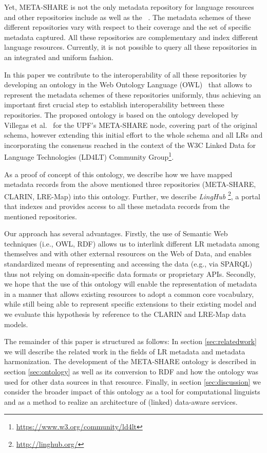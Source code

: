 \documentclass{llncs}
\begin{document}
Yet, META-SHARE is not the only metadata repository for language resources and other repositories include \cite[CLARIN]{broeder2010data} as well as the 
~\cite[LRE-Map]{calzolari2012lre}. The metadata schemes of these different repositories vary with respect to their coverage and the set of specific metadata captured. 
All these repositories are complementary and index different language resources. Currently, it is not possible to query all these repositories in an integrated and uniform fashion. 

In this paper we contribute to the interoperability of all these repositories by developing an ontology in the Web Ontology Language (OWL)~\cite{motik2012owl} that allows to represent the metadata schemes of these repositories uniformly, thus achieving an important first crucial step to establish interoperability between these repositories. The proposed ontology is based on the ontology developed by Villegas et al.~\cite{Villegas2014} for the UPF's META-SHARE node, covering part of the original schema, however extending this initial effort to the whole schema and all LRs and incorporating the consensus 
reached in the context of the W3C Linked Data for Language Technologies (LD4LT) Community Group\footnote{\url{https://www.w3.org/community/ld4lt}}.

As a proof of concept of this ontology, we describe how we have mapped metadata records from the above mentioned three repositories (META-SHARE, CLARIN, LRE-Map) into this ontology. Further, we describe \emph{LingHub} \footnote{\url{http://linghub.org/}}, a portal that indexes and provides access to all these metadata records from the mentioned repositories. 

Our approach has several advantages. Firstly, the use of Semantic Web techniques
(i.e., OWL, RDF) allows us to
interlink different LR metadata among themselves and with other external resources on the Web of Data, and enables standardized means of representing and accessing the data (e.g., via SPARQL) thus not relying on domain-specific data formats or proprietary APIs. Secondly, we hope that the use of this ontology will enable the representation of metadata in a manner that allows existing resources to adopt a
common core vocabulary, while still being able to represent specific extensions
to their existing model and we evaluate this hypothesis by reference to the
CLARIN and LRE-Map data models.

The remainder of this paper is structured as follows: In section
\ref{sec:relatedwork} we will describe the related work in the fields of
LR metadata and metadata harmonization. The development of the
META-SHARE ontology is described in section \ref{sec:ontology}
as well as its conversion to RDF and how the ontology was used for other data sources in that
resource. Finally, in section \ref{sec:discussion} we consider the broader
impact of this ontology as a tool for computational linguists and as a method to
realize an architecture of (linked) data-aware services.
\end{document}

